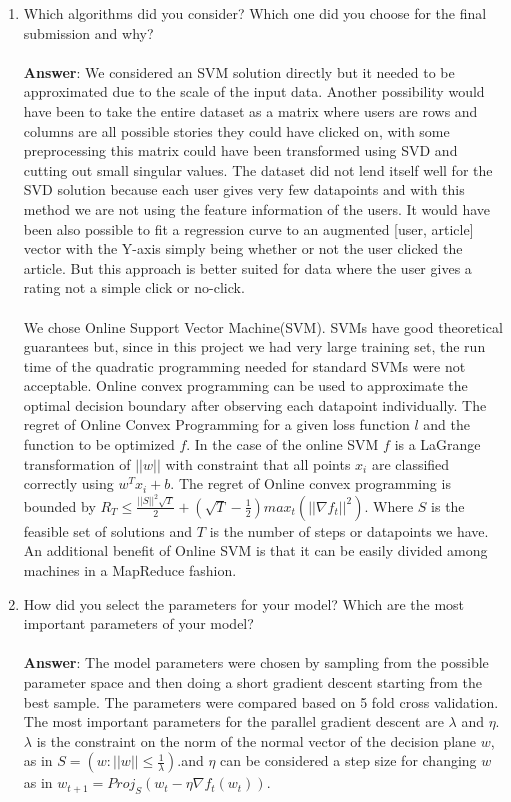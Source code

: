 \documentclass[11pt]{article}
\begin{document}
\begin{enumerate}
\item Which algorithms did you consider? Which one did you choose for the
  final submission and why? \\ \\
\textbf{Answer}:  
We considered an SVM solution directly but it needed to be approximated due to
the scale of the input data. Another possibility would have been to take the
entire dataset as a matrix where users are rows and columns are all possible
stories they could have clicked on, with some preprocessing this matrix could
have been transformed using SVD and cutting out small singular values. The
dataset did not lend itself well for the SVD solution because each user gives
very few datapoints and with this method we are not using the feature
information of the users. It would have been also possible to fit a regression
curve to an augmented [user, article] vector with the Y-axis simply being
whether or not the user clicked the article. But this approach is better suited
for data where the user gives a rating not a simple click or no-click.
\\ \\
We chose Online Support Vector Machine(SVM). SVMs have good theoretical
guarantees but, since in this project we had very large training set, the run
time of the quadratic programming needed for standard SVMs were not acceptable.
Online convex programming can be used to approximate the optimal decision
boundary after observing each datapoint individually. The regret of Online
Convex Programming for a given loss function $l$ and the function to be
optimized $f$. In the case of the online SVM $f$ is a LaGrange transformation
of $||w||$ with constraint that all points $x_i$ are classified correctly
using $w^T x_i + b$. The regret of Online convex programming is bounded by $R_T
\leq \frac{||S||^2 \sqrt{T}}{2} + (\sqrt{T} - \frac{1}{2}) max_t(||\nabla
f_t||^2)$. Where $S$ is the feasible set of solutions and $T$ is the number of
steps or datapoints we have. An additional benefit of Online SVM is that it can
be easily divided among machines in a MapReduce fashion.

\item How did you select the parameters for your model? Which are the
  most important parameters of your model? \\ \\
\textbf{Answer}: The model parameters were chosen by sampling from the
possible parameter space and then doing a short gradient descent starting from
the best sample. The parameters were compared based on 5 fold cross validation.
The most important parameters for the parallel gradient descent are $\lambda$
and $\eta$. $\lambda$ is the constraint on the norm of the normal vector of the
decision plane $w$, as in $S=(w:||w||\leq \frac{1}{\lambda})$.and $\eta$ can be
considered a step size for changing $w$ as in $w_{t+1} = Proj_S(w_t - \eta
\nabla f_t(w_t))$.

\end{enumerate}
\end{document}
